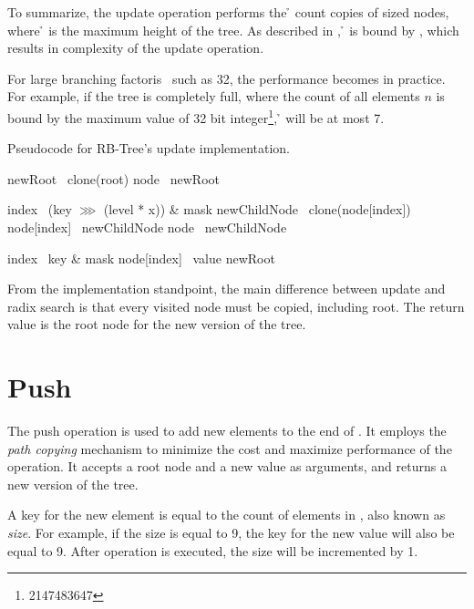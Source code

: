 To summarize, the update operation performs the \h{} count copies of \m{} sized nodes, where \h{} is the maximum height of the tree. As described in , \h{} is bound by , which results in {} complexity of the update operation. 

For large branching factoris \m\ such as 32, the performance becomes  in practice. For example, if the tree is completely full, where the count of all elements $n$ is bound by the maximum value of 32 bit integer\footnote{2147483647}, \h{} will be at most 7. 

\begin{listing}[ht!]        
    \caption{Pseudocode for RB-Tree's update implementation.}
    \label{lst:rb-tree-update}
    
    \begin{algorithmic}
            \State newRoot \la\ clone(root)
            \State node \la\ newRoot
    
                \State index \la\ (key $\ggg$ (level * x)) \& mask
                \State newChildNode \la\ clone(node[index])
                \State node[index] \la\ newChildNode
                \State node \la\ newChildNode
            \EndFor
    
            \State index \la\ key \& mask
            \State node[index] \la\ value
            \State \Return newRoot
        \EndFunction
    \end{algorithmic}
\end{listing}

From the implementation standpoint, the main difference between update and radix search is that every visited node must be copied, including root. The return value is the root node for the new version of the tree. 

\section{Push} 
The push operation is used to add new elements to the end of \rbtree{}. It employs the \emph{path copying} mechanism to minimize the cost and maximize performance of the operation. It accepts a root node and a new value as arguments, and returns a new version of the tree. 

A key for the new element is equal to the count of elements in \rbtree{}, also known as \emph{size}. For example, if the size is equal to 9, the key for the new value will also be equal to 9. After operation is executed, the size will be incremented by 1. 

